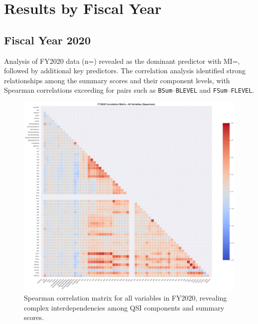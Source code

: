 \section{Results by Fiscal Year}
\label{sec:results-by-year}

\subsection{Fiscal Year 2020}
\label{subsec:fy2020}

Analysis of FY2020 data (n=\FSRecordsFinalFYTwoThousandTwenty) revealed \FSTopFeatureFYTwoThousandTwenty{} as the dominant predictor with MI=\FSTopMIFYTwoThousandTwenty, followed by additional key predictors. The correlation analysis identified strong relationships among the summary scores and their component levels, with Spearman correlations exceeding \FSCorrelationThreshold{} for pairs such as \texttt{BSum}--\texttt{BLEVEL} and \texttt{FSum}--\texttt{FLEVEL}.

\begin{figure}[htbp]
    \centering
    \includegraphics[width=\textwidth]{figures/fy2020_correlation_matrix_-_all_variables_(spearman).png}
    \caption{Spearman correlation matrix for all variables in FY2020, revealing complex interdependencies among QSI components and summary scores.}
    \label{fig:fy2020-corr-all}
\end{figure}

\newpage

